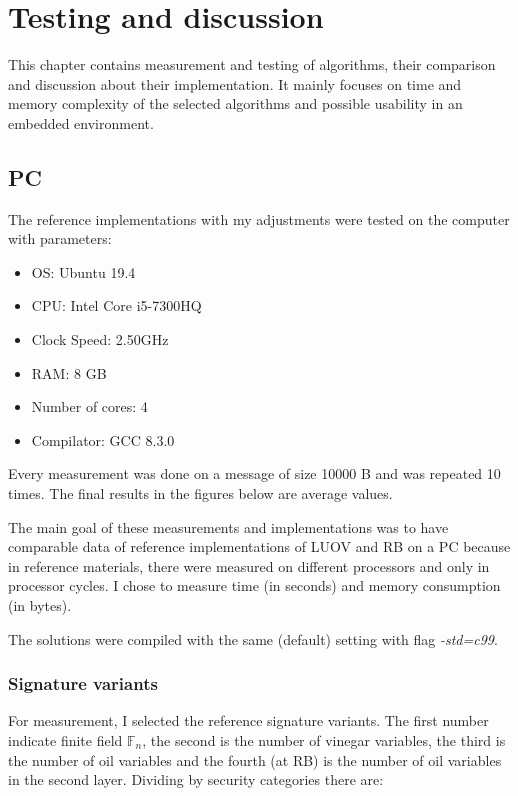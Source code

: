 \documentclass[thesis=M,english]{FITthesis}[2019/12/23]
\begin{document}
\chapter{Testing and discussion} \label{test-and-disk}
This chapter contains measurement and testing of algorithms, their comparison and discussion about their implementation. It mainly focuses on time and memory complexity of the selected algorithms and possible usability in an embedded environment.

\section{PC}
The reference implementations with my adjustments were tested on the computer with parameters:
\begin{itemize}
\item OS: Ubuntu 19.4
\item CPU: Intel Core i5-7300HQ
\item Clock Speed: 2.50GHz
\item RAM: 8 GB
\item Number of cores: 4
\item Compilator: GCC 8.3.0
\end{itemize}

\bigskip
\noindent
Every measurement was done on a message of size 10000 B and was repeated 10 times. The final results in the figures below are average values.

\bigskip
\noindent
The main goal of these measurements and implementations was to have comparable data of reference implementations of LUOV and RB on a PC because in reference materials, there were measured on different processors and only in processor cycles. I chose to measure time (in seconds) and memory consumption (in bytes).

\bigskip
\noindent
The solutions were compiled with the same (default) setting with flag \textit{-std=c99}.

\subsection{Signature variants} \label{pc-sign-variants}
For measurement, I selected the reference signature variants. The first number indicate finite field $\mathbb{F}_{n}$, the second is the number of vinegar variables, the third is the number of oil variables and the fourth (at RB) is the number of oil variables in the second layer. Dividing by security categories there are:
\end{document}
